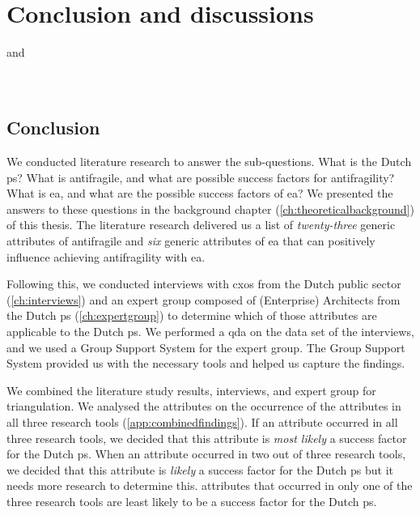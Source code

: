 \chapter{Conclusion and discussions}
\label{ch:conclusionanddiscussions}

\parencite{Dietz2008} and \parencite{Dietz2013}\\
\parencite{Digitaleoverheid2021}\\
\parencite{Knops2021}\\

\section{Conclusion}
\label{sec:conclusion}
We conducted literature research to answer the sub-questions. What is the Dutch \gls{ps}? What is \gls{antifragile}, and what are possible success factors for \gls{antifragility}? What is \acrlong{ea}, and what are the possible success factors of \acrlong{ea}? We presented the answers to these questions in the background chapter (\cref{ch:theoreticalbackground}) of this thesis. The literature research delivered us a list of \textit{twenty-three} generic attributes of \gls{antifragile} and \textit{six} generic \glspl{attribute} of \acrlong{ea} that can positively influence achieving \gls{antifragility} with \acrlong{ea}.

Following this, we conducted interviews with \glspl{cxo} from the Dutch public sector (\cref{ch:interviews}) and an expert group composed of (Enterprise) Architects from the Dutch \gls{ps} (\cref{ch:expertgroup}) to determine which of those \glspl{attribute} are applicable to the Dutch \gls{ps}. We performed a \acrlong{qda} on the data set of the interviews, and we used a Group Support System for the expert group. The Group Support System provided us with the necessary tools and helped us capture the findings. 

We combined the literature study results, interviews, and expert group for \gls{triangulation}. We analysed the \glspl{attribute} on the occurrence of the \glspl{attribute} in all three research tools (\cref{app:combinedfindings}). If an \gls{attribute} occurred in all three research tools, we decided that this \gls{attribute} is \textit{most likely} a success factor for the Dutch \gls{ps}. When an \gls{attribute} occurred in two out of three research tools, we decided that this \gls{attribute} is \textit{likely} a success factor for the Dutch \gls{ps} but it needs more research to determine this. \Glspl{attribute} that occurred in only one of the three research tools are least likely to be a success factor for the Dutch \gls{ps}.

